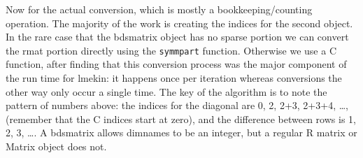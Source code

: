 \documentclass{article}
\begin{document}
Now for the actual conversion, which is mostly a
bookkeeping/counting operation. 
The majority of the work is creating
the indices for the second object.  In the rare case
that the bdsmatrix object has no sparse portion we 
can convert the rmat portion directly using the \Verb!symmpart!
function.  Otherwise we use a C function, after finding that
this conversion process was the major component of the run time for
lmekin:
it happens once per iteration whereas conversions the other way only occur
a single time. 
The key of the algorithm is to note the pattern of numbers above: the
indices for the diagonal are 0, 2, 2+3, 2+3+4, \ldots,
(remember that the C indices start at zero),
and the difference between rows is 1, 2, 3, \ldots.
A bdsmatrix allows dimnames to be an integer, but a regular R matrix or Matrix
object does not.
\end{document}
